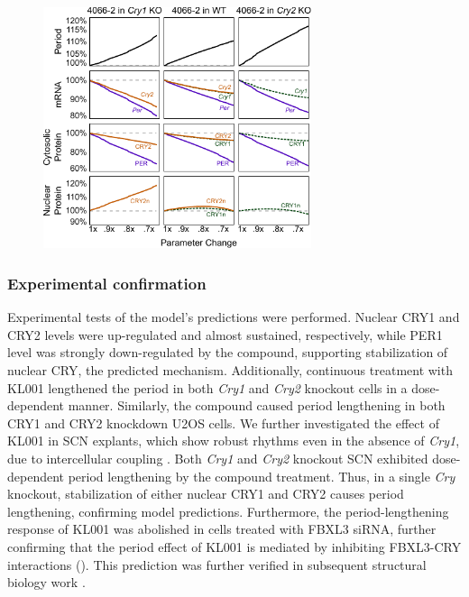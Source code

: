 \begin{figure}[bt]
    \centering
    \includegraphics[width=0.7\textwidth]{chap2/figures/prediction.pdf}
    \label{fig:40662prediction}
\end{figure}

\subsubsection{Experimental confirmation}
Experimental tests of the model's predictions were performed. 
Nuclear CRY1 and CRY2 levels were up-regulated and almost sustained, respectively, while PER1 level was strongly down-regulated by the compound, supporting stabilization of nuclear CRY, the predicted mechanism. 
Additionally, continuous treatment with KL001 lengthened the period in both {\it Cry1} and {\it Cry2} knockout cells in a dose-dependent manner. 
Similarly, the compound caused period lengthening in both CRY1 and CRY2 knockdown U2OS cells. 
We further investigated the effect of KL001 in SCN explants, which show robust rhythms even in the absence of {\it Cry1}, due to intercellular coupling \cite{Liu2007}. 
Both {\it Cry1} and {\it Cry2} knockout SCN exhibited dose-dependent period lengthening by the compound treatment. 
Thus, in a single {\it Cry} knockout, stabilization of either nuclear CRY1 and CRY2 causes period lengthening, confirming model predictions.
Furthermore, the period-lengthening response of KL001 was abolished in cells treated with FBXL3 siRNA, further confirming that the period effect of KL001 is mediated by inhibiting FBXL3-CRY interactions ().
This prediction was further verified in subsequent structural biology work \cite{Nangle2013}.

